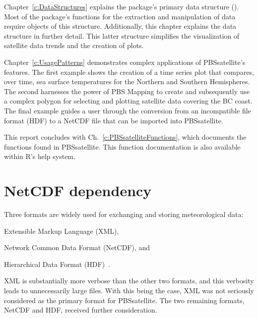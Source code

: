 \documentclass[11pt]{report}
\begin{document}
Chapter~\ref{c:DataStructures} explains the package's primary data structure ().
Most of the package's functions for the  extraction and manipulation of data require objects of this structure.
Additionally, this chapter explains the  data structure in further detail.
This latter structure simplifies the visualization of satellite data trends and the creation of plots.
 
Chapter~\ref{c:UsagePatterns} demonstrates complex applications of PBSsatellite's features.
The first example shows the creation of a time series plot that compares, over time, sea surface temperatures for the Northern and Southern Hemispheres.
The second harnesses the power of PBS Mapping to create and subsequently use a complex polygon for selecting and plotting satellite data covering the BC coast.
The final example guides a user through the conversion from an incompatible file format (HDF) to a NetCDF file that can be imported into PBSsatellite.

This report concludes with Ch.~\ref{c:PBSsatelliteFunctions}, which documents the functions found in PBSsatellite.
This function documentation is also available within R's help system.

\section{NetCDF dependency}
\label{s:ncdfDependency}

Three formats are widely used for exchanging and storing meteorological data:
\begin{enumerate*}[(a)]
\item Extensible Markup Language (XML),
\item Network Common Data Format (NetCDF), and
\item Hierarchical Data Format (HDF)~\cite{WMO15}.
\end{enumerate*}
XML is substantially more verbose than the other two formats, and this verbosity leads to unnecessarily large files.
With this being the case, XML was not seriously considered as the primary format for PBSsatellite.
The two remaining formats, NetCDF and HDF, received further consideration.
\end{document}
